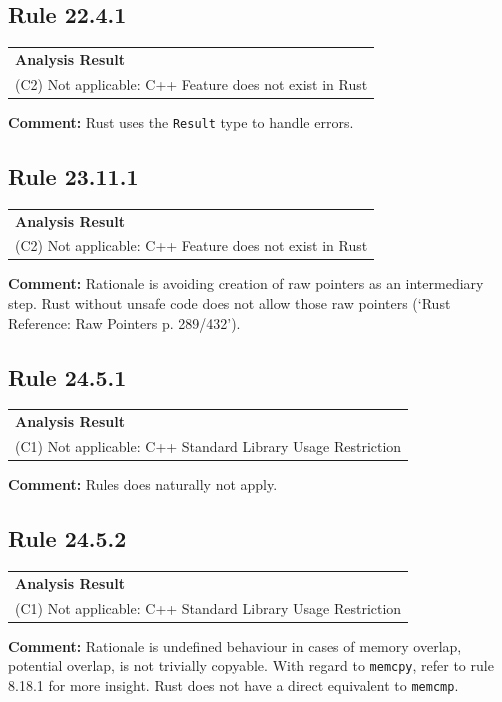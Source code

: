 \subsection*{Rule 22.4.1}
\begin{longtable}{p{13cm}}
\textbf{Analysis Result} \\
(C2) Not applicable: C++ Feature does not exist in Rust \\
\end{longtable}
\textbf{Comment:} Rust uses the \texttt{Result} type to handle errors. \\
\subsection*{Rule 23.11.1}
\begin{longtable}{p{13cm}}
\textbf{Analysis Result} \\
(C2) Not applicable: C++ Feature does not exist in Rust \\
\end{longtable}
\textbf{Comment:} Rationale is avoiding creation of raw pointers as an intermediary step. Rust without unsafe code does not allow those raw pointers (`Rust Reference: Raw Pointers p. 289/432'). \\
\subsection*{Rule 24.5.1}
\begin{longtable}{p{13cm}}
\textbf{Analysis Result} \\
(C1) Not applicable: C++ Standard Library Usage Restriction \\
\end{longtable}
\textbf{Comment:} Rules does naturally not apply. \\
\subsection*{Rule 24.5.2}
\begin{longtable}{p{13cm}}
\textbf{Analysis Result} \\
(C1) Not applicable: C++ Standard Library Usage Restriction \\
\end{longtable}
\textbf{Comment:} Rationale is undefined behaviour in cases of memory overlap, potential overlap, is not trivially copyable. With regard to \texttt{memcpy}, refer to rule 8.18.1 for more insight. Rust does not have a direct equivalent to \texttt{memcmp}. \\
